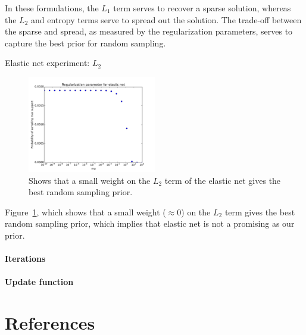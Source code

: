 \documentclass{article} %
\begin{document}
In these formulations, the $L_1$ term serves to recover a sparse solution, whereas the $L_2$ and entropy terms serve to spread out the solution. The trade-off between the sparse and spread, as measured by the regularization parameters, serves to capture the best prior for random sampling.

Elastic net experiment: $L_2$

\begin{figure}
  \centering
    \includegraphics[width=0.5\textwidth]{figures/regularization_elastic_net.pdf}
  \caption{Shows that a small weight on the $L_2$ term of the elastic net gives the best random sampling prior.}
  \label{regularization-elastic-net}
\end{figure}
Figure~\ref{regularization-elastic-net}, which shows that a small weight ($\approx 0$) on the $L_2$ term gives the best random sampling prior, which implies that elastic net is not a promising as our prior.

\paragraph{Iterations}



\paragraph{Update function}

\section{References}

\FloatBarrier
\vskip 0.2in
\nocite{*}


\end{document}
